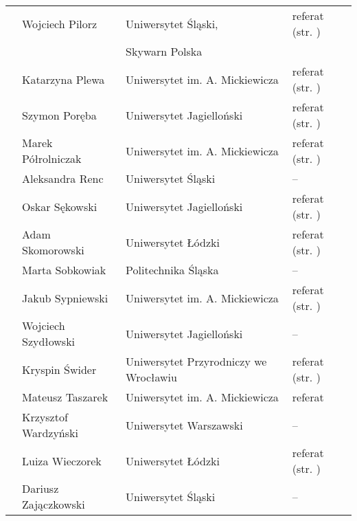 \documentclass[12pt,oneside]{book}
\begin{document}
\begin{tabular}{||c|l|l|l||}
	 & Wojciech Pilorz & Uniwersytet Śląski, & referat (str. \pageref{piasecki})\\
	 &  & Skywarn Polska &  \\\hline
  	 & Katarzyna Plewa & Uniwersytet im. A. Mickiewicza & referat  (str. \pageref{plewa})\\\hline
	 & Szymon Poręba & Uniwersytet Jagielloński & referat (str. \pageref{poreba}) \\\hline
	 & Marek Półrolniczak & Uniwersytet im. A. Mickiewicza & referat (str. \pageref{kolendowicz}) \\\hline
 	 & Aleksandra Renc & Uniwersytet Śląski & -- \\\hline
	 & Oskar Sękowski & Uniwersytet Jagielloński & referat (str. \pageref{sekowski}) \\\hline
	 & Adam Skomorowski & Uniwersytet Łódzki & referat (str. \pageref{skomorowski}) \\\hline	
	 & Marta Sobkowiak & Politechnika Śląska & -- \\\hline
	 & Jakub Sypniewski & Uniwersytet im. A. Mickiewicza & referat (str. \pageref{sypniewski}) \\\hline
	 & Wojciech Szydłowski & Uniwersytet Jagielloński & -- \\\hline
	 & Kryspin Świder & Uniwersytet Przyrodniczy we Wrocławiu & referat (str. \pageref{swider}) \\\hline
	 & Mateusz Taszarek & Uniwersytet im. A. Mickiewicza & referat \\\hline
 	 & Krzysztof Wardzyński & Uniwersytet Warszawski & -- \\\hline
   & Luiza Wieczorek & Uniwersytet Łódzki & referat (str. \pageref{wieczorek}) \\\hline
   & Dariusz Zajączkowski & Uniwersytet Śląski & -- \\\hline
	
\hline
\hline
\end{tabular}

\printindex[a]
%


\backmatter



%
\end{document}
